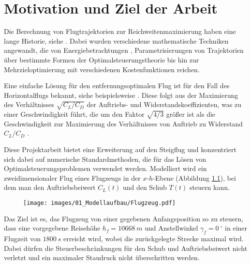 \chapter{Motivation und Ziel der Arbeit}
Die Berechnung von Flugtrajektorien zur Reichweitenmaximierung haben eine lange Historie, siehe  \cite{Burrows1982, Murrieta2016, Schaback2017, Pierson1989}.  Dabei wurden verschiedene mathematische Techniken angewandt, die von Energiebetrachtungen \cite{Calise1977}, Parametrisierungen von Trajektorien \cite{Burrows1982} über bestimmte Formen der Optimalsteuerungstheorie \cite{Javier2016} bis hin zur Mehrzieloptimierung mit verschiedenen Kostenfunktionen \cite{Gardi2016} reichen. 

Eine einfache Lösung für den entfernungsoptimalen Flug ist für den Fall des Horizontalflugs bekannt, siehe beispielsweise \cite{Peckham1974}. Diese folgt aus der Maximierung des Verhältnisses $\sqrt{C_{L}/C_{D}}$ der Auftriebs- und Widerstandskoeffizienten, was zu einer Geschwindigkeit führt, die um den Faktor $\sqrt{4/3}$ größer ist als die Geschwindigkeit zur Maximierung des Verhältnisses von Auftrieb zu Widerstand $C_{L}/C_{D}$ \cite{Schaback2017}.  

Diese Projektarbeit bietet eine Erweiterung auf den Steigflug und konzentriert sich dabei auf numerische Standardmethoden, die für das Lösen von Optimalsteuerungsproblemen verwendet werden. Modelliert wird ein zweidimensionaler Flug eines Flugzeugs in der $x$-$h$-Ebene (Abbildung \ref{img:Flugzeug}), bei dem man den Auftriebsbeiwert $C_L(t)$ und den Schub $T(t)$ steuern kann.

\begin{figure}[H]
    \begin{center}
        \texttt{[image: images/01\_Modellaufbau/Flugzeug.pdf]}
        \label{img:Flugzeug}
    \end{center}
\end{figure}

Das Ziel ist es, das Flugzeug von einer gegebenen Anfangsposition so zu steuern, dass eine vorgegebene Reisehöhe $h_f = 10668\ m$ und Anstellwinkel $\gamma_f = 0\ ^{\circ}$ in einer Flugzeit von $1800 \ s$ erreicht  wird, wobei die zurückgelegte Strecke maximal wird. Dabei dürfen die Steuerbeschränkungen für den Schub und Auftriebsbeiwert nicht verletzt und ein maximaler Staudruck nicht überschritten werden. 

